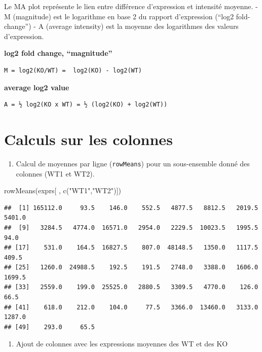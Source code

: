 \documentclass[
]{book}
\newenvironment{Shaded}{\begin{snugshade}}{\end{snugshade}}
\newcommand{\FunctionTok}[1]{\textcolor[rgb]{0.00,0.00,0.00}{#1}}
\newcommand{\NormalTok}[1]{#1}
\newcommand{\StringTok}[1]{\textcolor[rgb]{0.31,0.60,0.02}{#1}}
\providecommand{\tightlist}{%
  \setlength{\itemsep}{0pt}\setlength{\parskip}{0pt}}
\begin{document}
Le MA plot représente le lien entre différence d'expression et intensité moyenne.
- M (magnitude) est le logarithme en base 2 du rapport d'expression (``log2 fold-change'')
- A (average intensity) est la moyenne des logarithmes des valeurs d'expression.

\textbf{log2 fold change, ``magnitude''}

\begin{verbatim}
M = log2(KO/WT) =  log2(KO) - log2(WT)
\end{verbatim}

\textbf{average log2 value}

\begin{verbatim}
A = ½ log2(KO x WT) = ½ (log2(KO) + log2(WT))
\end{verbatim}

\hypertarget{calculs-sur-les-colonnes}{%
\section{Calculs sur les colonnes}\label{calculs-sur-les-colonnes}}

\begin{enumerate}
\def\labelenumi{\arabic{enumi}.}
\tightlist
\item
  Calcul de moyennes par ligne (\texttt{rowMeans}) pour un sous-ensemble donné des colonnes (WT1 et WT2).
\end{enumerate}

\begin{Shaded}
\begin{Highlighting}[]
\FunctionTok{rowMeans}\NormalTok{(exprs[   , }\FunctionTok{c}\NormalTok{(}\StringTok{"WT1"}\NormalTok{,}\StringTok{"WT2"}\NormalTok{)])}
\end{Highlighting}
\end{Shaded}

\begin{verbatim}
##  [1] 165112.0     93.5    146.0    552.5   4877.5   8812.5   2019.5   5401.0
##  [9]   3284.5   4774.0  16571.0   2954.0   2229.5  10023.5   1995.5     94.0
## [17]    531.0    164.5  16827.5    807.0  48148.5   1350.0   1117.5    409.5
## [25]   1260.0  24988.5    192.5    191.5   2748.0   3388.0   1606.0   1699.5
## [33]   2559.0    199.0  25525.0   2880.5   3309.5   4770.0    126.0     66.5
## [41]    618.0    212.0    104.0     77.5   3366.0  13460.0   3133.0   1287.0
## [49]    293.0     65.5
\end{verbatim}

\begin{enumerate}
\def\labelenumi{\arabic{enumi}.}
\setcounter{enumi}{1}
\tightlist
\item
  Ajout de colonnes avec les expressions moyennes des WT et des KO
\end{enumerate}
\end{document}

